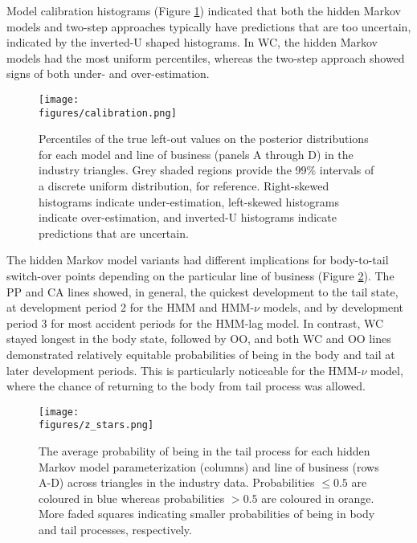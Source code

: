 Model calibration histograms (Figure \ref{fig:percentiles})
indicated that both the hidden Markov models
and two-step approaches typically have predictions that
are too uncertain, indicated by the inverted-U shaped
histograms. In WC, the hidden Markov models had the most
uniform percentiles, whereas the two-step approach
showed signs of both under- and over-estimation.

\begin{figure}
    \centering
    \texttt{[image: \\figures/calibration.png]}
    \caption{
        Percentiles of the true left-out values on the posterior distributions
        for each model and line of business (panels A through D) in the industry triangles.
        Grey shaded regions provide the 99\% intervals of a discrete uniform
        distribution, for reference.
        Right-skewed histograms indicate under-estimation,
        left-skewed histograms indicate over-estimation,
        and inverted-U histograms indicate predictions that
        are uncertain.
    }
    \label{fig:percentiles}
\end{figure}

The hidden Markov model variants had different
implications for body-to-tail switch-over points
depending on the particular line of business
(Figure \ref{fig:zstars}).
The PP and CA lines showed, in general,
the quickest development to the tail
state, at development period 2 for the HMM
and HMM-$\nu$ models, and by development
period 3 for most accident periods for the
HMM-lag model. In contrast, WC stayed
longest in the body state, followed by
OO, and both WC and OO lines demonstrated
relatively equitable probabilities of being
in the body and tail at later development
periods. This is particularly noticeable for
the HMM-$\nu$ model, where the chance
of returning to the body from tail process
was allowed.

\begin{figure}
    \centering
    \texttt{[image: \\figures/z\_stars.png]}
    \caption{
        The average probability of being in the tail process
        for each hidden Markov model parameterization (columns)
        and line of business (rows A-D) across triangles
        in the industry data.
        Probabilities $\leq 0.5$ are coloured
        in blue whereas probabilities $> 0.5$
        are coloured in orange. More faded squares
        indicating smaller probabilities of being
        in body and tail processes, respectively.
    }
    \label{fig:zstars}
\end{figure}

